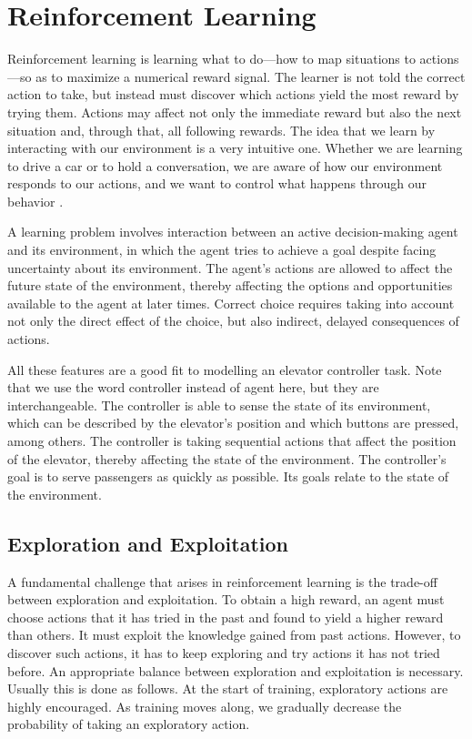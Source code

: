 \section{Reinforcement Learning}

Reinforcement learning is learning what to do—how to map situations to actions—so as to maximize a numerical reward signal. The learner is not told the correct action to take, but instead must discover which actions yield the most reward by trying them. Actions may affect not only the immediate reward but also the next situation and, through that, all following rewards. The idea that we learn by interacting with our environment is a very intuitive one. Whether we are learning to drive a car or to hold a conversation, we are aware of how our environment responds to our actions, and we want to control what happens through our behavior \cite{sutton_barto_2012}.

A learning problem involves interaction between an active decision-making agent and its environment, in which the agent tries to achieve a goal despite facing uncertainty about its environment. The agent’s actions are allowed to affect the future state of the environment, thereby affecting the options and opportunities available to the agent at later times. Correct choice requires taking into account not only the direct effect of the choice, but also indirect, delayed consequences of actions.

All these features are a good fit to modelling an elevator controller task. Note that we use the word controller instead of agent here, but they are interchangeable. The controller is able to sense the state of its environment, which can be described by the elevator's position and which buttons are pressed, among others. The controller is taking sequential actions that affect the position of the elevator, thereby affecting the state of the environment. The controller's goal is to serve passengers as quickly as possible. Its goals relate to the state of the environment.

\subsection{Exploration and Exploitation}

A fundamental challenge that arises in reinforcement learning is the trade-off between exploration and exploitation. To obtain a high reward, an agent must choose actions that it has tried in the past and found to yield a higher reward than others. It must exploit the knowledge gained from past actions. However, to discover such actions, it has to keep exploring and try actions it has not tried before. An appropriate balance between exploration and exploitation is necessary. Usually this is done as follows. At the start of training, exploratory actions are highly encouraged. As training moves along, we gradually decrease the probability of taking an exploratory action.  

